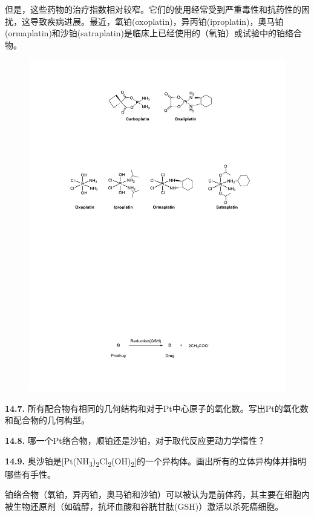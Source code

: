 但是，这些药物的治疗指数相对较窄。它们的使用经常受到严重毒性和抗药性的困扰，这导致疾病进展。最近，氧铂(oxoplatin)，异丙铂(iproplatin)，奥马铂(ormaplatin)和沙铂(satraplatin)是临床上已经使用的（氧铂）或试验中的铂络合物。

\begin{figure}[h]
	\centering
	\includegraphics[width=13cm]{./pic/t14-5.pdf}
\end{figure}

\noindent\textbf{14.7.}
所有配合物有相同的几何结构和对于Pt中心原子的氧化数。写出Pt的氧化数和配合物的几何构型。

\noindent\textbf{14.8.} 哪一个Pt络合物，顺铂还是沙铂，对于取代反应更动力学惰性？

\noindent\textbf{14.9.}
奥沙铂是[Pt(NH\textsubscript{3})\textsubscript{2}Cl\textsubscript{2}(OH)\textsubscript{2}]的一个异构体。画出所有的立体异构体并指明哪些有手性。

铂络合物（氧铂，异丙铂，奥马铂和沙铂）可以被认为是前体药，其主要在细胞内被生物还原剂（如硫醇，抗坏血酸和谷胱甘肽(GSH)）激活以杀死癌细胞。

